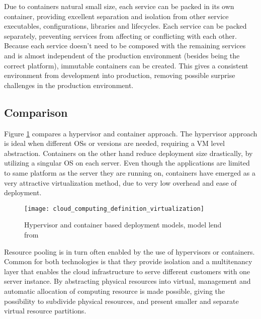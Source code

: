 Due to containers natural small size, each service can be packed in its own container, providing excellent separation and isolation from other service executables, configurations, libraries and lifecycles. Each service can be packed separately, preventing services from affecting or conflicting with each other. Because each service doesn't need to be composed with the remaining services and is almost independent of the production environment (besides being the correct platform), immutable containers can be created\cite{kubernetes_what_is}. This gives a consistent environment from development into production, removing possible surprise challenges in the production environment.


\subsection{Comparison}
Figure \ref{fig:cloud_computing_definition_virtualization} compares a hypervisor and container approach. The hypervisor approach is ideal when different OSs or versions are needed, requiring a VM level abstraction\cite{bernstein2014containers}. Containers on the other hand reduce deployment size drastically, by utilizing a singular OS on each server. Even though the applications are limited to same platform as the server they are running on, containers have emerged as a very attractive virtualization method, due to very low overhead and ease of deployment\cite{fink2014docker}.

\begin{figure}[!htb]
	\centering 
		 \texttt{[image: cloud\_computing\_definition\_virtualization]}  
	  \caption{Hypervisor and container based deployment models, model lend from \citeauthor{bernstein2014containers}}
  \label{fig:cloud_computing_definition_virtualization}
\end{figure}


Resource pooling is in turn often enabled by the use of hypervisors or containers\cite{bernstein2014containers}. Common for both technologies is that they provide isolation and a multitenancy layer that enables the cloud infrastructure to serve different customers with one server instance\cite{krebs2012architectural}. By abstracting physical resources into virtual, management and automatic allocation of computing resource is made possible\cite{sosinsky2010cloud, armbrust2010view}, giving the possibility to subdivide physical resources, and present smaller and separate virtual resource partitions\cite{barham2003xen}. 


